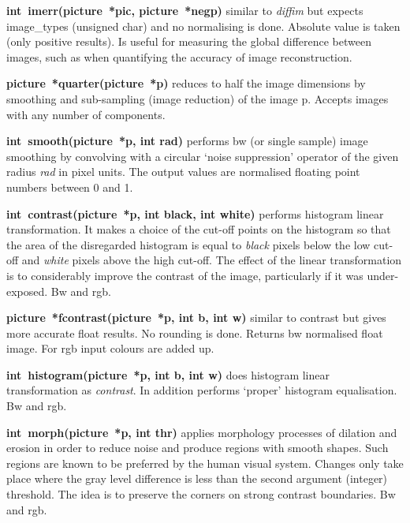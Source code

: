 \documentclass[11pt,twoside,english,a4paper]{article}
\begin{document}
\textbf{int~imerr(picture~{*pic}, picture~{*negp})} similar to \emph{diffim} but
expects image\_types (unsigned char) and no normalising is done. Absolute value
is taken (only positive results). Is useful for measuring the global difference between images,
such as when quantifying the accuracy of image reconstruction.

\textbf{picture~{*}quarter(picture~{*p})} reduces to half the image dimensions
by smoothing and sub-sampling (image reduction) of the image p. Accepts images
with any number of components.

\textbf{int~smooth(picture~{*p}, int rad)} performs bw (or single 
sample) image smoothing by convolving with a circular `noise suppression'
operator of the given radius \emph{rad} in pixel units. The output
values are normalised floating point numbers between 0 and 1.

\textbf{int~contrast(picture~{*p}, int black, int white)} performs histogram linear
transformation. It makes a choice of the cut-off points on the histogram
so that the area of the disregarded histogram is equal to \emph{black}
pixels below the low cut-off and \emph{white} pixels above the high
cut-off. The effect of the linear transformation is to considerably
improve the contrast of the image, particularly if it was under-exposed.
Bw and rgb.
 
\textbf{picture~{*}fcontrast(picture~{*p}, int b, int w)} similar to contrast
but gives more accurate float results. No rounding is done. Returns bw
normalised float image. For rgb input colours are added up.
 
\textbf{int~histogram(picture~{*p}, int b, int w)} does histogram linear
transformation as \textit{contrast}. In addition performs `proper'
histogram equalisation. Bw and rgb. 

\textbf{int~morph(picture~{*p}, int thr)} applies morphology processes
of dilation and erosion in order to reduce noise and produce regions
with smooth shapes. Such regions are known to be preferred by the
human visual system. Changes only take place where the gray level
difference is less than the second argument (integer) threshold. The
idea is to preserve the corners on strong contrast boundaries. Bw
and rgb.
\end{document}
